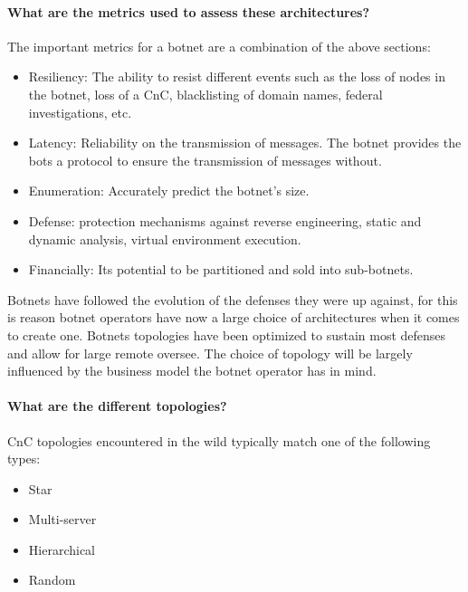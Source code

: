 \paragraph{What are the metrics used to assess these architectures?}
The important metrics for a botnet are a combination of the above sections:
\begin{itemize}[noitemsep]
\item Resiliency: The ability to resist different events such as the loss of nodes in the botnet, loss of a CnC, blacklisting of domain names, federal investigations, etc.
\item Latency: Reliability on the transmission of messages. The botnet provides the bots a protocol to ensure the transmission of messages without.
\item Enumeration: Accurately predict the botnet's size.
\item Defense: protection mechanisms against reverse engineering, static and dynamic analysis, virtual environment execution.
\item Financially: Its potential to be partitioned and sold into sub-botnets. 
\end{itemize}

Botnets have followed the evolution of the defenses they were up against, for this is reason botnet operators have now a large choice of architectures when it comes to create one. Botnets topologies have been optimized to sustain most defenses and allow for large remote oversee. The choice of topology will be largely influenced by the business model the botnet operator has in mind.

\paragraph{What are the different topologies?}
CnC topologies encountered in the wild typically match one of the following types:
\begin{itemize}[noitemsep]
\item Star
\item Multi-server
\item Hierarchical
\item Random
\end{itemize}

